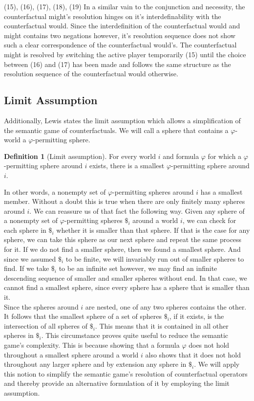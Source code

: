 \documentclass[a4paper,american]{paper}
\theoremstyle{definition}\newtheorem{definition}{Definition}
\begin{document}
\indent (15), (16), (17), (18), (19) In a similar vain to the conjunction and necessity, the counterfactual might's resolution hinges on it's interdefinability with the counterfactual would. Since the interdefinition of the counterfactual would and might contains two negations however, it's resolution sequence does not show such a clear correspondence of the counterfactual would's. The counterfactual might is resolved by switching the active player temporarily (15) until the choice between (16) and (17) has been made and follows the same structure as the resolution sequence of the counterfactual would otherwise.
\subsection{Limit Assumption}
Additionally, Lewis states the limit assumption which allows a simplification of the semantic game of counterfactuals. We will call a sphere that contains a $\varphi$-world a $\varphi$-permitting sphere.
\begin{definition}[Limit assumption]
For every world $i$ and formula $\varphi$ for which a $\varphi$-permitting sphere around $i$ exists, there is a smallest $\varphi$-permitting sphere around $i$.
\end{definition}
In other words, a nonempty set of $\varphi$-permitting spheres around $i$ has a smallest member. Without a doubt this is true when there are only finitely many spheres around $i$. We can reassure us of that fact the following way. Given any sphere of a nonempty set of $\varphi$-permitting spheres $\$_i$ around a world $i$, we can check for each sphere in $\$_i$ whether it is smaller than that sphere. If that is the case for any sphere, we can take this sphere as our next sphere and repeat the same process for it. If we do not find a smaller sphere, then we found a smallest sphere. And since we assumed $\$_i$ to be finite, we will invariably run out of smaller spheres to find.
If we take $\$_i$ to be an infinite set however, we may find an infinite descending sequence of smaller and smaller spheres without end. In that case, we cannot find a smallest sphere, since every sphere has a sphere that is smaller than it.\\
\indent Since the spheres around $i$ are nested, one of any two spheres contains the other. It follows that the smallest sphere of a set of spheres $\$_i$, if it exists, is the intersection of all spheres of $\$_i$. This means that it is contained in all other spheres in $\$_i$. This circumstance proves quite useful to reduce the semantic game's complexity. This is because showing that a formula $\varphi$ does not hold throughout a smallest sphere around a world $i$ also shows that it does not hold throughout any larger sphere and by extension any sphere in $\$_i$. We will apply this notion to simplify the semantic game's resolution of counterfactual operators and thereby provide an alternative formulation of it by employing the limit assumption.
\end{document}
